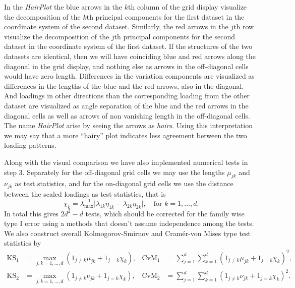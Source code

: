 \documentclass[titlepage,11pt,twoside]{article}
\begin{document}
In the \emph{HairPlot} the blue arrows in the $k$th column of the grid display visualize the decomposition of the $k$th principal components for the first dataset in the coordinate system of the second dataset. Similarly, the red arrows in the $j$th row visualize the decomposition of the $j$th principal components for the second dataset in the coordinate system of the first dataset. If the structures of the two datasets are identical, then we will have coinciding blue and red arrows along the diagonal in the grid display, and nothing else as arrows in the off-diagonal cells would have zero length. Differences in the variation components are visualized as differences in the lengths of the blue and the red arrows, also in the diagonal. And loadings in other directions than the corresponding loading from the other dataset are visualized as angle separation of the blue and the red arrows in the diagonal cells as well as arrows of non vanishing length in the off-diagonal cells. The name \emph{HairPlot} arise by seeing the arrows as \emph{hairs}. Using this interpretation we may say that a more ``hairy'' plot indicates less agreement between the two loading patterns.

Along with the visual comparison we have also implemented numerical tests in step 3. Separately for the off-diagonal grid cells we may use the lengths $\mu_{jk}$ and $\nu_{jk}$ as test statistics, and for the on-diagonal grid cells we use the distance between the scaled loadings as test statistics, that is
\begin{equation*}
\chi_k = \lambda_{\max}^{-1} \lvert \lambda_{1k} \eta_{1k} - \lambda_{2k} \eta_{2k} \rvert, \quad \text{for $k=1,\dotsc,d$.}
\end{equation*}
In total this gives $2d^2 - d$ tests, which should be corrected for the family wise type I error using a methods that doesn't assume independence among the tests. We also construct overall Kolmogorov-Smirnov and Cram\'er-von Mises type test statistics by
\begin{align*}
\text{KS}_1 &= \max_{j,k=1,\dotsc,d} (1_{j \neq k} \mu_{jk} + 1_{j=k} \chi_k), &
\text{CvM}_1 &= \sum_{j=1}^d \sum_{k=1}^d (1_{j \neq k} \mu_{jk} + 1_{j=k} \chi_k)^2, \\
\text{KS}_2 &= \max_{j,k=1,\dotsc,d} (1_{j \neq k} \nu_{jk} + 1_{j=k} \chi_k), &
\text{CvM}_2 &= \sum_{j=1}^d \sum_{k=1}^d (1_{j \neq k} \nu_{jk} + 1_{j=k} \chi_k)^2.
\end{align*}

\end{document}
